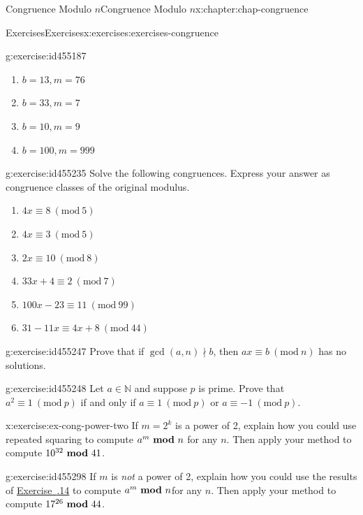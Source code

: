 \documentclass[oneside,10pt,]{book}
\newcommand{\xreffont}{\relax}
\numberwithin{equation}{section}
\newcommand{\Mod}[1]{\ \left(\mathrm{mod}\ #1\right)}
\newcommand{\mmod}[1]{\ \mathrm{\bf mod}\ #1}
\begin{document}
\begin{chapterptx}{Congruence Modulo \(n\)}{}{Congruence Modulo \(n\)}{}{}{x:chapter:chap-congruence}
\begin{exercises-section}{Exercises}{}{Exercises}{}{}{x:exercises:exercises-congruence}
\begin{divisionexercise}{10}{}{}{g:exercise:id455187}
\begin{enumerate}[label=(\alph*)]
\item{}\(\displaystyle b = 13, m = 76\)%
\item{}\(\displaystyle b = 33, m = 7\)%
\item{}\(\displaystyle b = 10, m = 9\)%
\item{}\(\displaystyle b = 100, m = 999\)%
\end{enumerate}
%
\end{divisionexercise}%
\begin{divisionexercise}{11}{}{}{g:exercise:id455235}%
Solve the following congruences. Express your answer as congruence classes of the original modulus.%
\begin{enumerate}[label=(\alph*)]
\item{}\(\displaystyle 4x \equiv 8 \Mod{5}\)%
\item{}\(\displaystyle 4x \equiv 3 \Mod{5}\)%
\item{}\(\displaystyle 2x \equiv 10 \Mod{8}\)%
\item{}\(\displaystyle 33x + 4 \equiv 2 \Mod{7}\)%
\item{}\(\displaystyle 100x - 23 \equiv 11 \Mod{99}\)%
\item{}\(\displaystyle 31 - 11x \equiv 4x + 8 \Mod{44}\)%
\end{enumerate}
%
\end{divisionexercise}%
\begin{divisionexercise}{12}{}{}{g:exercise:id455247}%
Prove that if \(\gcd(a,n) \nmid b\), then \(ax \equiv b \Mod{n}\) has no solutions.%
\end{divisionexercise}%
\begin{divisionexercise}{13}{}{}{g:exercise:id455248}%
Let \(a \in \mathbb{N}\) and suppose \(p\) is prime. Prove that \(a^2 \equiv 1 \Mod{p}\) if and only if \(a \equiv 1 \Mod{p}\) or \(a \equiv -1 \Mod{p}\).%
\end{divisionexercise}%
\begin{divisionexercise}{14}{}{}{x:exercise:ex-cong-power-two}%
If \(m = 2^k\) is a power of 2, explain how you could use repeated squaring to compute \(a^m \mmod{n}\) for any \(n\). Then apply your method to compute \(10^{32} \mmod 41\).%
\end{divisionexercise}%
\begin{divisionexercise}{15}{}{}{g:exercise:id455298}%
If \(m\) is \emph{not} a power of 2, explain how you could use the results of \hyperlink{x:exercise:ex-cong-power-two}{Exercise~{\xreffont 4.6.14}} to compute \(a^m \mmod{n}\)for any \(n\). Then apply your method to compute \(17^{26} \mmod 44\).%

\end{divisionexercise}
\end{exercises-section}
\end{chapterptx}
\end{document}
